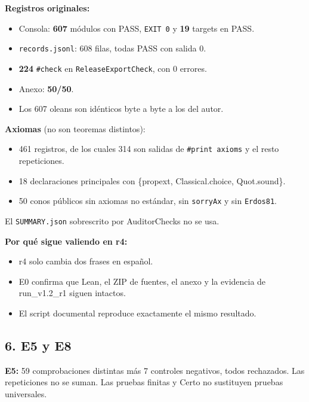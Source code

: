 \documentclass[
]{article}
\providecommand{\tightlist}{%
  \setlength{\itemsep}{0pt}\setlength{\parskip}{0pt}}
\begin{document}
\textbf{Registros originales:}

\begin{itemize}
\tightlist
\item
  Consola: \textbf{607} módulos con PASS, \texttt{EXIT\ 0} y \textbf{19}
  targets en PASS.
\item
  \texttt{records.jsonl}: 608 filas, todas PASS con salida 0.
\item
  \textbf{224} \texttt{\#check} en \texttt{ReleaseExportCheck}, con 0
  errores.
\item
  Anexo: \textbf{50/50}.
\item
  Los 607 oleans son idénticos byte a byte a los del autor.
\end{itemize}

\textbf{Axiomas} (no son teoremas distintos):

\begin{itemize}
\tightlist
\item
  461 registros, de los cuales 314 son salidas de
  \texttt{\#print\ axioms} y el resto repeticiones.
\item
  18 declaraciones principales con \{propext, Classical.choice,
  Quot.sound\}.
\item
  50 conos públicos sin axiomas no estándar, sin \texttt{sorryAx} y sin
  \texttt{Erdos81}.
\end{itemize}

El \texttt{SUMMARY.json} sobrescrito por AuditorChecks no se usa.

\textbf{Por qué sigue valiendo en r4:}

\begin{itemize}
\tightlist
\item
  r4 solo cambia dos frases en español.
\item
  E0 confirma que Lean, el ZIP de fuentes, el anexo y la evidencia de
  run\_v1.2\_r1 siguen intactos.
\item
  El script documental reproduce exactamente el mismo resultado.
\end{itemize}

\subsection{6. E5 y E8}\label{6-e5-y-e8}

\textbf{E5:} 59 comprobaciones distintas más 7 controles negativos,
todos rechazados. Las repeticiones no se suman. Las pruebas finitas y
Certo no sustituyen pruebas universales.
\end{document}
